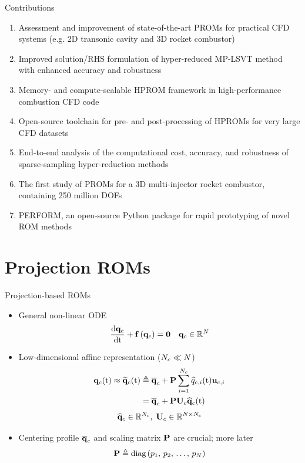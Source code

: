 \documentclass[]{beamer}
\begin{document}
\begin{frame}{Contributions}
    \begin{enumerate}
        \item Assessment and improvement of state-of-the-art PROMs for practical CFD systems (e.g. 2D transonic cavity and 3D rocket combustor)
        \item Improved solution/RHS formulation of hyper-reduced MP-LSVT method with enhanced accuracy and robustness
        \item Memory- and compute-scalable HPROM framework in high-performance combustion CFD code
        \item Open-source toolchain for pre- and post-processing of HPROMs for very large CFD datasets
        \item End-to-end analysis of the computational cost, accuracy, and robustness of sparse-sampling hyper-reduction methods
        \item The first study of PROMs for a 3D multi-injector rocket combustor, containing 250 million DOFs
        \item PERFORM, an open-source Python package for rapid prototyping of novel ROM methods
    \end{enumerate}
\end{frame}

\section*{Projection ROMs}

\begin{frame}{Projection-based ROMs}
    \begin{itemize}
		\item General non-linear ODE
		\begin{equation*}
			\frac{\text{d} \mathbf{q}_c}{\text{d} \text{t}} + \mathbf{f} \left(\mathbf{q}_c\right) = \mathbf{0} \quad \mathbf{q}_c \in \mathbb{R}^{N}
		\end{equation*}
			\item Low-dimensional affine representation ($N_c \ll N$)
		\begin{align*}
			\consVec(\timeVar) \approx \consVecRom(\timeVar) &\triangleq \consVecCent + \consScale \sum^{\numConsvModes}_{i=1} \consVarCoef(\timeVar) \consTrialVec \\
			&= \consVecCent + \consScale \consTrial \consVecCoef(\timeVar)
		\end{align*}
		\begin{equation*}
			\consVecCoef \in \mathbb{R}^{\numConsvModes}, \; \consTrial \in \mathbb{R}^{\numDOF \times \numConsvModes}
		\end{equation*}
		\item Centering profile $\mathbf{\overline{q}}_c$ and scaling matrix $\consScale$ are crucial; more later
		\begin{equation*}
			\consScale \triangleq \text{diag}\left( \consScaleVar_1, \, \consScaleVar_2, \, \hdots, \, \consScaleVar_{\numDOF} \right)
		\end{equation*}
	\end{itemize}
\end{frame}
\end{document}
